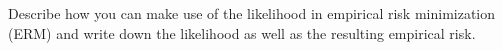 \documentclass[a4paper]{article}
\begin{document}
{\begin{enumerate}[a)]
  Describe how you can make use of the likelihood in empirical risk minimization 
  (ERM) and write down the likelihood as well as the resulting empirical risk.

\end{enumerate}



}

\dlz
\end{document}
